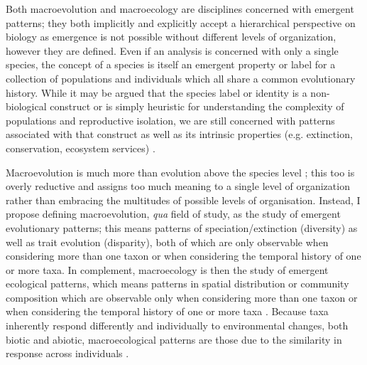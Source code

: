 Both macroevolution and macroecology are disciplines concerned with emergent patterns; they both implicitly and explicitly accept a hierarchical perspective on biology as emergence is not possible without different levels of organization, however they are defined. Even if an analysis is concerned with only a single species, the concept of a species is itself an emergent property or label for a collection of populations and individuals which all share a common evolutionary history. While it may be argued that the species label or identity is a non-biological construct or is simply heuristic for understanding the complexity of populations and reproductive isolation, we are still concerned with patterns associated with that construct as well as its intrinsic properties (e.g. extinction, conservation, ecosystem services) \citep{Coyne2004,Jablonski2008a}.

Macroevolution is much more than evolution above the species level \citep{Foote2007b}; this too is overly reductive and assigns too much meaning to a single level of organization rather than embracing the multitudes of possible levels of organisation. Instead, I propose defining macroevolution, \textit{qua} field of study, as the study of emergent evolutionary patterns; this means patterns of speciation/extinction (diversity) as well as trait evolution (disparity), both of which are only observable when considering more than one taxon or when considering the temporal history of one or more taxa. In complement, macroecology is then the study of emergent ecological patterns, which means patterns in spatial distribution or community composition which are observable only when considering more than one taxon or when considering the temporal history of one or more taxa \citep{Brown1989,Brown1995,Smith2008b}. Because taxa inherently respond differently and individually to environmental changes, both biotic and abiotic, macroecological patterns are those due to the similarity in response across individuals \citep{Blois2009}.

